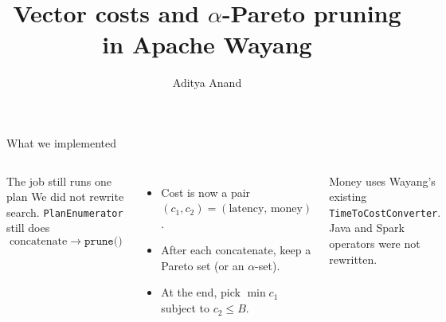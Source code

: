 \documentclass[aspectratio=169,11pt]{beamer}
\title{Vector costs and $\alpha$-Pareto pruning\\in Apache Wayang}
\author{Aditya Anand}
\institute{IIT Delhi}
\date{}
\begin{document}
\begin{frame}{What we implemented}
\begin{columns}[T]
\begin{block}{The job still runs one plan}
We did not rewrite search.
\texttt{PlanEnumerator} still does
\[
\text{concatenate}\;\to\;\texttt{prune()}
\]
\end{block}
\vspace{0.15cm}
{\small
\begin{itemize}
  \item Cost is now a pair \((c_1,c_2)=(\text{latency},\,\text{money})\).
  \item After each concatenate, keep a Pareto set (or an \(\alpha\)-set).
  \item At the end, pick \(\min c_1\) subject to \(c_2\le B\).
\end{itemize}}
\centering
{}

\vspace{0.2cm}
{\scriptsize\color{darkgray}
Money uses Wayang's existing \texttt{TimeToCostConverter}.\\
Java and Spark operators were not rewritten.}
\end{columns}
\end{frame}
\end{document}
